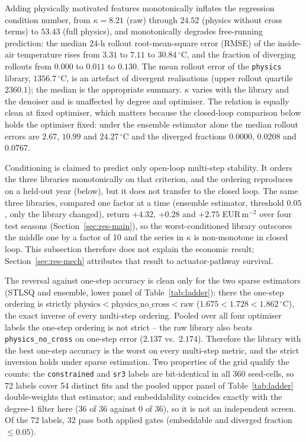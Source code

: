 Adding physically motivated features monotonically inflates the regression condition
number, from $\kappa=8.21$ (raw) through $24.52$ (physics without cross terms) to $53.43$
(full physics), and monotonically degrades free-running prediction: the median 24-h
rollout root-mean-square error (RMSE) of the inside-air temperature rises from $3.31$ to $7.11$ to $30.84\,^\circ$C,
and the fraction of diverging rollouts from $0.000$ to $0.011$ to $0.130$. The mean
rollout error of the \texttt{physics} library, $1356.7\,^\circ$C, is an artefact of
divergent realisations (upper rollout quartile $2360.1$); the median is the appropriate
summary. $\kappa$ varies with the library and the denoiser and is unaffected by degree and
optimiser. The relation is equally clean at fixed optimiser, which matters because the
closed-loop comparison below holds the optimiser fixed: under the ensemble estimator alone
the median rollout errors are $2.67$, $10.99$ and $24.27\,^\circ$C and the diverged
fractions $0.0000$, $0.0208$ and $0.0767$.

Conditioning is claimed to predict only open-loop multi-step stability. It orders the
three libraries monotonically on that criterion, and the ordering reproduces on a held-out
year (below), but it does not transfer to the closed loop. The same three libraries,
compared one factor at a time (ensemble estimator, threshold $0.05$, only the library
changed), return $+4.32$, $+0.28$ and $+2.75$ EUR\,m$^{-2}$ over four test seasons
(Section~\ref{sec:res-main}), so the worst-conditioned library outscores the middle one by a
factor of 10 and the series in $\kappa$ is non-monotone in closed loop. This subsection
therefore does not explain the economic result; Section~\ref{sec:res-mech} attributes that
result to actuator-pathway survival.

The reversal against one-step accuracy is clean only for the two sparse estimators
(STLSQ and ensemble, lower panel of Table~\ref{tab:ladder}): there the one-step ordering
is strictly $\text{physics} < \text{physics\_no\_cross} < \text{raw}$
($1.675 < 1.728 < 1.862\,^\circ$C), the exact inverse of every multi-step ordering.
Pooled over all four optimiser labels the one-step ordering is not strict -- the raw
library also beats \texttt{physics\_no\_cross} on one-step error ($2.137$ vs.\ $2.174$).
Therefore the library with the best one-step accuracy is the worst on every multi-step
metric, and the strict inversion holds under sparse estimation. Two properties of the grid
qualify the counts: the \texttt{constrained} and \texttt{sr3} labels are bit-identical in
all 360 seed-cells, so 72 labels cover 54 distinct fits and the pooled upper panel of
Table~\ref{tab:ladder} double-weights that estimator;
and embeddability coincides exactly with the degree-1 filter here (36 of 36 against
0 of 36), so it is not an independent screen. Of the 72 labels, 32 pass both
applied gates (embeddable and diverged fraction $\le 0.05$).

